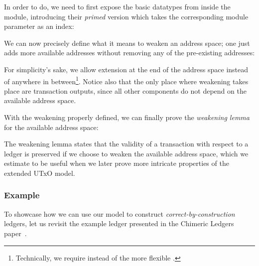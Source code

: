 \documentclass[acmsmall,nonacm=true,screen=true]{acmart}
\begin{document}
In order to do, we need to first expose the basic datatypes from inside the module,
introducing their \textit{primed} version which takes the corresponding module parameter as an index:

\UTXOprimedTypes{}

We can now precisely define what it means to weaken an address space; one just adds more available
addresses without removing any of the pre-existing addresses:

\UTXOweaken{}
For simplicity's sake, we allow extension at the end of the address space instead of anywhere in
between\footnote{Technically, we require \inlinePrefix{} instead of the more flexible \inlineSubset{}.}.
Notice also that the only place where weakening takes place are transaction outputs, since all other
components do not depend on the available address space.

With the weakening properly defined, we can finally prove the \textit{weakening lemma} for the available address space:

\UTXOweakenLemma{}
The weakening lemma states that the validity of a transaction with respect to a ledger is preserved if
we choose to weaken the available address space, which we estimate to be useful when we later prove more 
intricate properties of the extended UTxO model.

\subsubsection{Example} \label{subsec:utxo-example}
To showcase how we can use our model to construct \textit{correct-by-construction} ledgers,
let us revisit the example ledger presented in the Chimeric Ledgers paper~\cite{chimeric}.
\end{document}
